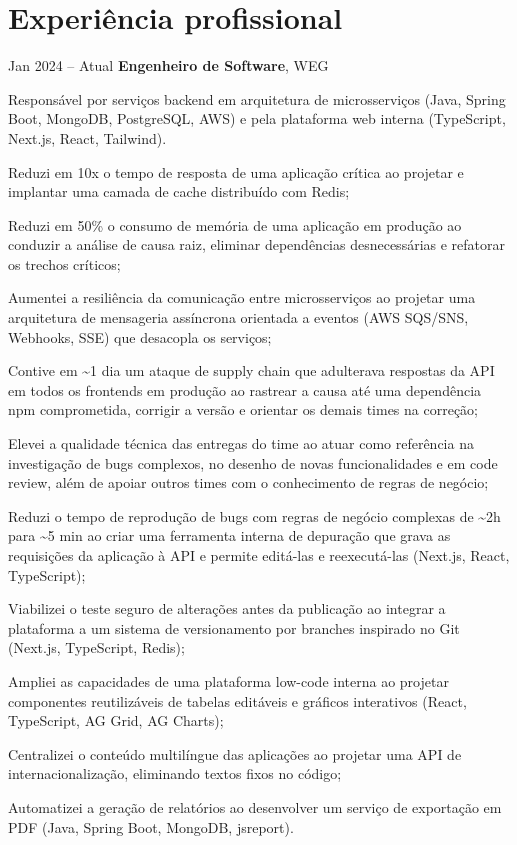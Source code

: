 \section{Experiência profissional}

\begin{twocolentry}{Jan 2024 – Atual}
\textbf{Engenheiro de Software}, WEG\end{twocolentry}
\vspace{0.10 cm}
\begin{onecolentry}
    Responsável por serviços backend em arquitetura de microsserviços (Java, Spring Boot, MongoDB, PostgreSQL, AWS) e pela plataforma web interna (TypeScript, Next.js, React, Tailwind).
    \begin{highlights}
        \item Reduzi em 10x o tempo de resposta de uma aplicação crítica ao projetar e implantar uma camada de cache distribuído com Redis;
        \item Reduzi em 50\% o consumo de memória de uma aplicação em produção ao conduzir a análise de causa raiz, eliminar dependências desnecessárias e refatorar os trechos críticos;
        \item Aumentei a resiliência da comunicação entre microsserviços ao projetar uma arquitetura de mensageria assíncrona orientada a eventos (AWS SQS/SNS, Webhooks, SSE) que desacopla os serviços;
        \item Contive em \textasciitilde 1 dia um ataque de supply chain que adulterava respostas da API em todos os frontends em produção ao rastrear a causa até uma dependência npm comprometida, corrigir a versão e orientar os demais times na correção;
        \item Elevei a qualidade técnica das entregas do time ao atuar como referência na investigação de bugs complexos, no desenho de novas funcionalidades e em code review, além de apoiar outros times com o conhecimento de regras de negócio;
        \item Reduzi o tempo de reprodução de bugs com regras de negócio complexas de \textasciitilde 2h para \textasciitilde 5 min ao criar uma ferramenta interna de depuração que grava as requisições da aplicação à API e permite editá-las e reexecutá-las (Next.js, React, TypeScript);
        \item Viabilizei o teste seguro de alterações antes da publicação ao integrar a plataforma a um sistema de versionamento por branches inspirado no Git (Next.js, TypeScript, Redis);
        \item Ampliei as capacidades de uma plataforma low-code interna ao projetar componentes reutilizáveis de tabelas editáveis e gráficos interativos (React, TypeScript, AG Grid, AG Charts);
        \item Centralizei o conteúdo multilíngue das aplicações ao projetar uma API de internacionalização, eliminando textos fixos no código;
        \item Automatizei a geração de relatórios ao desenvolver um serviço de exportação em PDF (Java, Spring Boot, MongoDB, jsreport).
    \end{highlights}

\end{onecolentry}


